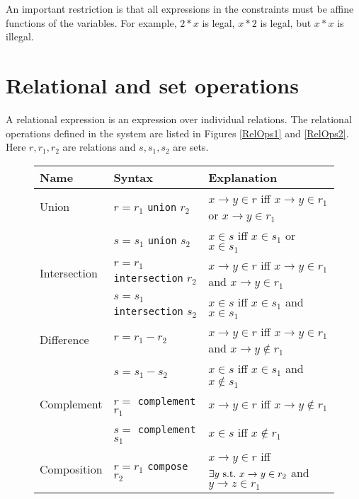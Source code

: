 An important restriction is that all expressions in
the constraints must be affine functions of the variables.
For example, $2\ast x$ is legal, $x \ast 2$ is legal, but $x \ast x$ is
illegal.

\section{Relational and set operations}

A relational expression is an expression over individual relations.
The relational operations defined in the system are listed
in Figures \ref{RelOps1} and \ref{RelOps2}. 
Here $r, r_1, r_2$ are relations and $s, s_1,
s_2$ are sets.


\begin{figure}[tbp]
\begin{tabular}{l|l|p{3.5in}}
Name & Syntax & Explanation \\\hline

Union & 
$r = r_1$ {\tt union} $r_2$ 
& $x \rightarrow y \in  r$ iff $x \rightarrow y \in  r_1$
or $x \rightarrow y \in  r_1$
\\

& 
$s = s_1$ {\tt union} $s_2$ 
& $x \in  s$ iff $x \in  s_1$
or $x \in  s_1$
\\

Intersection & 
$r = r_1$ {\tt intersection} $r_2$
& $x \rightarrow y \in  r$ iff $x \rightarrow y \in  r_1$
and $x \rightarrow y \in  r_1$
\\

& 
$s = s_1$ {\tt intersection} $s_2$
& $x \in  s$ iff $x \in  s_1$
and $x \in  s_1$
\\

Difference &
$r = r_1 - r_2$ 
& $x \rightarrow y \in  r$ iff $x \rightarrow y \in  r_1$
and $x \rightarrow y \not\in  r_1$
\\

&
$s = s_1 - s_2$ 
& $x \in  s$ iff $x \in  s_1$
and $x \not\in  s_1$
\\

Complement &
$r =$ {\tt complement} $r_1$ 
& $x \rightarrow y \in  r$ iff $x \rightarrow y \not\in  r_1$
\\

&
$s =$ {\tt complement} $s_1$ 
& $x \in  s$ iff $x \not\in  r_1$
\\

Composition &
$r = r_1$ {\tt compose} $r_2$ &
$x \rightarrow y \in r$ iff $\exists y {\rm \ s.t.\ } x \rightarrow y \in r_2$
and $ y \rightarrow z \in r_1$
\\


\end{tabular}
\end{figure}
